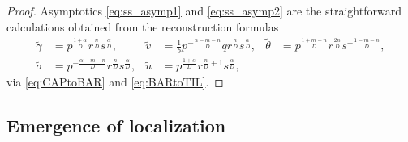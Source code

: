 \documentclass[usletter,11pt]{article}
\def\tg{{\tilde{\gamma}}}
\def\tv{{\tilde{v}}}
\def\tth{{\tilde{\theta}}}
\def\ts{{\tilde{\sigma}}}
\def\tu{{\tilde{u}}}
\theoremstyle{remark}
\begin{document}
\begin{proof}
Asymptotics \eqref{eq:ss_asymp1} and \eqref{eq:ss_asymp2} are the straightforward calculations obtained from the reconstruction formulas
\begin{align*}
 \tg&=p^{\frac{1+\alpha}{D}}r^{\frac{n}{D}}s^{\frac{\alpha}{D}}, & \tv &= \frac{1}{b} p^{-\frac{\alpha-m-n}{D}}qr^{\frac{n}{D}}s^{\frac{\alpha}{D}}, & \tth&=p^{\frac{1+m+n}{D}}r^{\frac{2n}{D}}s^{-\frac{1-m-n}{D}}, \\ \ts&=p^{-\frac{\alpha-m-n}{D}}r^{\frac{n}{D}}s^{\frac{\alpha}{D}},  & \tu&=p^{\frac{1+\alpha}{D}}r^{\frac{n}{D}+1}s^{\frac{\alpha}{D}},
\end{align*}
via \eqref{eq:CAPtoBAR} and \eqref{eq:BARtoTIL}.
%
%
%
\end{proof}

\subsection{Emergence of localization}
\label{sec:emloc}
\end{document}
